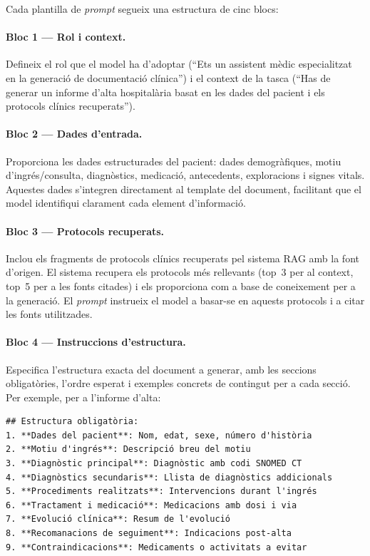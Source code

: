 \documentclass[CAT]{TFUOC}%
\begin{document}
Cada plantilla de \textit{prompt} segueix una estructura de cinc blocs:

\paragraph{Bloc 1 --- Rol i context.}
Defineix el rol que el model ha d'adoptar (``Ets un assistent mèdic especialitzat en la generació de documentació clínica'') i el context de la tasca (``Has de generar un informe d'alta hospitalària basat en les dades del pacient i els protocols clínics recuperats'').

\paragraph{Bloc 2 --- Dades d'entrada.}
Proporciona les dades estructurades del pacient: dades demogràfiques, motiu d'ingrés/consulta, diagnòstics, medicació, antecedents, exploracions i signes vitals. Aquestes dades s'integren directament al template del document, facilitant que el model identifiqui clarament cada element d'informació.

\paragraph{Bloc 3 --- Protocols recuperats.}
Inclou els fragments de protocols clínics recuperats pel sistema RAG amb la font d'origen. El sistema recupera els protocols més rellevants (top~3 per al context, top~5 per a les fonts citades) i els proporciona com a base de coneixement per a la generació. El \textit{prompt} instrueix el model a basar-se en aquests protocols i a citar les fonts utilitzades.

\paragraph{Bloc 4 --- Instruccions d'estructura.}
Especifica l'estructura exacta del document a generar, amb les seccions obligatòries, l'ordre esperat i exemples concrets de contingut per a cada secció. Per exemple, per a l'informe d'alta:

\begin{verbatim}
## Estructura obligatòria:
1. **Dades del pacient**: Nom, edat, sexe, número d'història
2. **Motiu d'ingrés**: Descripció breu del motiu
3. **Diagnòstic principal**: Diagnòstic amb codi SNOMED CT
4. **Diagnòstics secundaris**: Llista de diagnòstics addicionals
5. **Procediments realitzats**: Intervencions durant l'ingrés
6. **Tractament i medicació**: Medicacions amb dosi i via
7. **Evolució clínica**: Resum de l'evolució
8. **Recomanacions de seguiment**: Indicacions post-alta
9. **Contraindicacions**: Medicaments o activitats a evitar
\end{verbatim}
\end{document}
